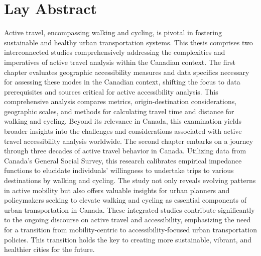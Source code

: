 \documentclass[
11pt, %
oneside, %
english, %
singlespacing, %
]{macthesis} %
\def\blankpage{%
      \clearpage%
      \thispagestyle{empty}%
      \addtocounter{page}{-1}%
      \null%
      \clearpage}
\begin{document}
\section*{Lay Abstract}
  Active travel, encompassing walking and cycling, is pivotal in fostering sustainable and healthy urban transportation systems. This thesis comprises two interconnected studies comprehensively addressing the complexities and imperatives of active travel analysis within the Canadian context. The first chapter evaluates geographic accessibility measures and data specifics necessary for assessing these modes in the Canadian context, shifting the focus to data prerequisites and sources critical for active accessibility analysis. This comprehensive analysis compares metrics, origin-destination considerations, geographic scales, and methods for calculating travel time and distance for walking and cycling. Beyond its relevance in Canada, this examination yields broader insights into the challenges and considerations associated with active travel accessibility analysis worldwide. The second chapter embarks on a journey through three decades of active travel behavior in Canada. Utilizing data from Canada's General Social Survey, this research calibrates empirical impedance functions to elucidate individuals' willingness to undertake trips to various destinations by walking and cycling. The study not only reveals evolving patterns in active mobility but also offers valuable insights for urban planners and policymakers seeking to elevate walking and cycling as essential components of urban transportation in Canada. These integrated studies contribute significantly to the ongoing discourse on active travel and accessibility, emphasizing the need for a transition from mobility-centric to accessibility-focused urban transportation policies. This transition holds the key to creating more sustainable, vibrant, and healthier cities for the future.
\blankpage
\clearpage


\end{document}
